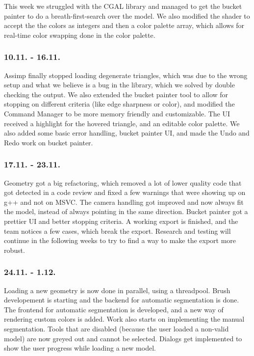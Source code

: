 This week we struggled with the CGAL library and managed to get the bucket painter to do a breath-first-search over the model. We also modified the shader to accept the the colors as integers and then a color palette array, which allows for real-time color swapping done in the color palette.

\subsubsection{10.11. - 16.11.}

Assimp finally stopped loading degenerate triangles, which was due to the wrong setup and what we believe is a bug in the library, which we solved by double checking the output. We also extended the bucket painter tool to allow for stopping on different criteria (like edge sharpness or color), and modified the Command Manager to be more memory friendly and customizable. The UI received a highlight for the hovered triangle, and an editable color palette. We also added some basic error handling, bucket painter UI, and made the Undo and Redo work on bucket painter.

\subsubsection{17.11. - 23.11.}

Geometry got a big refactoring, which removed a lot of lower quality code that got detected in a code review and fixed a few warnings that were showing up on g++ and not on MSVC. The camera handling got improved and now always fit the model, instead of always pointing in the same direction. Bucket painter got a prettier UI and better stopping criteria. A working export is finished, and the team notices a few cases, which break the export. Research and testing will continue in the following weeks to try to find a way to make the export more robust.

\subsubsection{24.11. - 1.12.}

Loading a new geometry is now done in parallel, using a threadpool. Brush developement is starting and the backend for automatic segmentation is done. The frontend for automatic segmentation is developed, and a new way of rendering custom colors is added. Work also starts on implementing the manual segmentation. Tools that are disabled (because the user loaded a non-valid model) are now greyed out and cannot be selected. Dialogs get implemented to show the user progress while loading a new model.

